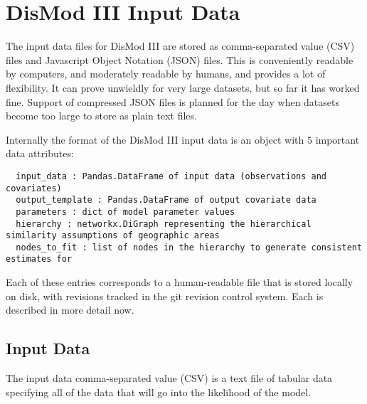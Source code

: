 \section{DisMod III Input Data}

The input data files for DisMod III are stored as comma-separated
value (CSV) files and Javascript Object Notation (JSON) files.  This
is conveniently readable by computers, and moderately readable by
humans, and provides a lot of flexibility.  It can prove unwieldly for
very large datasets, but so far it has worked fine.  Support of
compressed JSON files is planned for the day when datasets become too
large to store as plain text files.

Internally the format of the DisMod III input data is an object with $5$ important data attributes:
\begin{verbatim}
  input_data : Pandas.DataFrame of input data (observations and covariates)
  output_template : Pandas.DataFrame of output covariate data
  parameters : dict of model parameter values
  hierarchy : networkx.DiGraph representing the hierarchical similarity assumptions of geographic areas
  nodes_to_fit : list of nodes in the hierarchy to generate consistent estimates for
\end{verbatim}

Each of these entries corresponds to a human-readable file that is
stored locally on disk, with revisions tracked in the git revision
control system.  Each is described in more detail now.

\subsection{Input Data}
The input data comma-separated value (CSV) is a text file of tabular
data specifying all of the data that will go into the likelihood of
the model.


